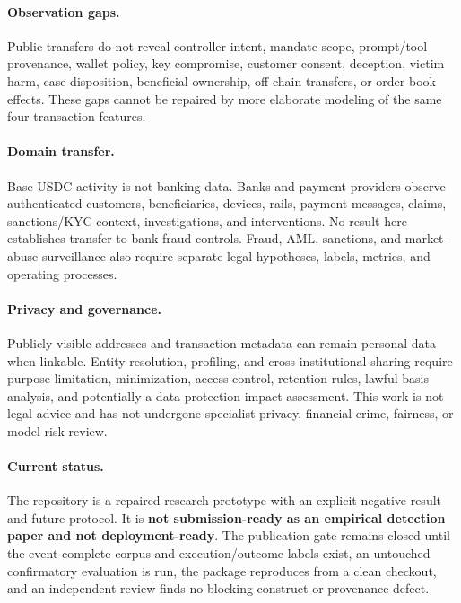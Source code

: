 \paragraph{Observation gaps.}
Public transfers do not reveal controller intent, mandate scope, prompt/tool
provenance, wallet policy, key compromise, customer consent, deception, victim
harm, case disposition, beneficial ownership, off-chain transfers, or order-book
effects.  These gaps cannot be repaired by more elaborate modeling of the same
four transaction features.

\paragraph{Domain transfer.}
Base USDC activity is not banking data.  Banks and payment providers observe
authenticated customers, beneficiaries, devices, rails, payment messages,
claims, sanctions/KYC context, investigations, and interventions.  No result
here establishes transfer to bank fraud controls.  Fraud, AML, sanctions, and
market-abuse surveillance also require separate legal hypotheses, labels,
metrics, and operating processes.

\paragraph{Privacy and governance.}
Publicly visible addresses and transaction metadata can remain personal data
when linkable.  Entity resolution, profiling, and cross-institutional sharing
require purpose limitation, minimization, access control, retention rules,
lawful-basis analysis, and potentially a data-protection impact assessment.
This work is not legal advice and has not undergone specialist privacy,
financial-crime, fairness, or model-risk review.

\paragraph{Current status.}
The repository is a repaired research prototype with an explicit negative
result and future protocol.  It is \textbf{not submission-ready as an empirical
detection paper and not deployment-ready}.  The publication gate remains
closed until the event-complete corpus and execution/outcome labels exist, an
untouched confirmatory evaluation is run, the package reproduces from a clean
checkout, and an independent review finds no blocking construct or provenance
defect.
